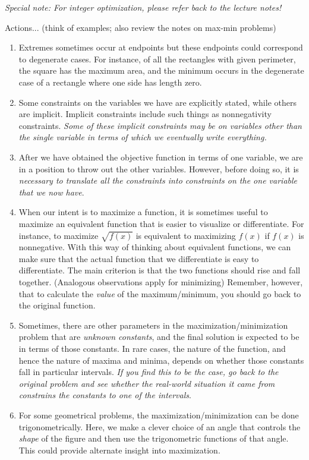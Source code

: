 \documentclass[10pt]{amsart}
\begin{document}
{\em Special note: For integer optimization, please refer back to the
lecture notes!}

Actions... (think of examples; also review the notes on max-min problems)

\begin{enumerate}
\item Extremes sometimes occur at endpoints but these endpoints could
  correspond to degenerate cases. For instance, of all the rectangles
  with given perimeter, the square has the maximum area, and the
  minimum occurs in the degenerate case of a rectangle where one side
  has length zero.
\item Some constraints on the variables we have are explicitly stated,
  while others are implicit. Implicit constraints include such things
  as nonnegativity constraints. {\em Some of these implicit
  constraints may be on variables other than the single variable in
  terms of which we eventually write everything.}
\item After we have obtained the objective function in terms of one
  variable, we are in a position to throw out the other
  variables. However, before doing so, it is {\em necessary to
  translate all the constraints into constraints on the one variable
  that we now have}. 
\item When our intent is to maximize a function, it is sometimes
  useful to maximize an equivalent function that is easier to
  visualize or differentiate. For instance, to maximize $\sqrt{f(x)}$
  is equivalent to maximizing $f(x)$ if $f(x)$ is nonnegative. With
  this way of thinking about equivalent functions, we can make sure
  that the actual function that we differentiate is easy to
  differentiate. The main criterion is that the two functions should
  rise and fall together. (Analogous observations apply for
  minimizing) Remember, however, that to calculate the {\em value} of
  the maximum/minimum, you should go back to the original function.
\item Sometimes, there are other parameters in the
  maximization/minimization problem that are {\em unknown constants},
  and the final solution is expected to be in terms of those
  constants. In rare cases, the nature of the function, and hence the
  nature of maxima and minima, depends on whether those constants fall
  in particular intervals. {\em If you find this to be the case, go
  back to the original problem and see whether the real-world
  situation it came from constrains the constants to one of the
  intervals}.
\item For some geometrical problems, the maximization/minimization can
  be done trigonometrically. Here, we make a clever choice of an angle
  that controls the {\em shape} of the figure and then use the
  trigonometric functions of that angle. This could provide alternate
  insight into maximization.
\end{enumerate}
\end{document}
